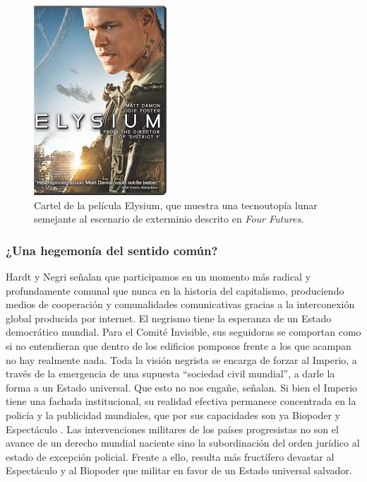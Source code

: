 \begin{figure}
  \centering
  \includegraphics[width=0.7\linewidth]{images/elysium.png}
  \caption{Cartel de la película Elysium, que muestra una tecnoutopía lunar semejante al escenario de exterminio descrito en \emph{Four Futures}.}
  \label{fig:elyssium}
\end{figure}

\subsubsection{¿Una hegemonía del sentido común?}
\label{una-hegemonía-del-sentido-común}

Hardt y Negri señalan que participamos en un momento más radical y profundamente comunal que nunca en la historia del capitalismo, produciendo medios de cooperación y comunalidades comunicativas gracias a la interconexión global producida por internet. El negrismo tiene la esperanza de un Estado democrático mundial. Para el Comité Invisible, sus seguidoras se comportan como si no entendieran que dentro de los edificios pomposos frente a los que acampan no hay realmente nada. Toda la visión negrista se encarga de forzar al Imperio, a través de la emergencia de una supuesta \enquote{sociedad civil mundial}, a darle la forma a un Estado universal. Que esto no nos engañe, señalan. Si bien el Imperio tiene una fachada institucional, su realidad efectiva permanece concentrada en la policía y la publicidad mundiales, que por sus capacidades son ya Biopoder y Espectáculo \autocite{comiteinvisibleNuestrosAmigos2015}. Las intervenciones militares de los países progresistas no son el avance de un derecho mundial naciente sino la subordinación del orden jurídico al estado de excepción policial. Frente a ello, resulta más fructífero devastar al Espectáculo y al Biopoder que militar en favor de un Estado universal salvador.

